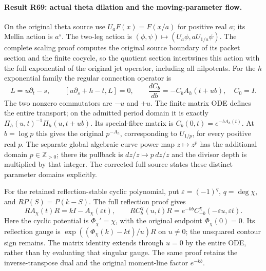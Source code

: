 \paragraph{Result R69: actual theta dilation and the moving-parameter flow.}
On the original theta source use
$U_aF(x)=F(x/a)$ for positive real $a$; its Mellin action is
$a^s$. The two-leg action is
$(\phi,\psi)\mapsto(U_a\phi,aU_{1/a}\psi)$.
The complete scaling proof computes the original source boundary
of its packet section and the finite cocycle, so the quotient
section intertwines this action with the full exponential of
the original jet operator, including all nilpotents.
For the $h$ exponential family the regular connection operator is
\[
L=u\partial_t-s,\qquad
[u\partial_s+h-t,L]=0,
\qquad
\frac{dC_b}{db}=-C_bA_h(t+ub),\quad C_0=I.
\]
The two nonzero commutators are $-u$ and $+u$. The finite matrix
ODE defines the entire transport; on the admitted period domain
it is exactly $\Pi_h(u,t)^{-1}\Pi_h(u,t+ub)$.
Its special-fibre matrix is $C_b(0,t)=e^{-bA_h(t)}$.
At $b=\log p$ this gives the original $p^{-A_h}$, corresponding
to $U_{1/p}$, for every positive real $p$. The separate global algebraic curve power
map $z\mapsto z^p$ has the additional domain $p\in\mathbb Z_{>0}$;
there its pullback is $dz/z\mapsto p\,dz/z$ and the divisor
depth is multiplied by that integer. The corrected full source
states these distinct parameter domains explicitly.

For the retained reflection-stable cyclic polynomial, put
$\varepsilon=(-1)^q$, $q=\deg\chi$, and
$RP(S)=P(k-S)$. The full reflection proof gives
\[
RA_\chi(t)R=kI-A_\chi(\varepsilon t),\qquad
RC_b^\chi(u,t)R=e^{-kb}C_{-b}^\chi(-\varepsilon u,\varepsilon t).
\]
Here the cyclic potential is $\Phi_\chi'=\chi$, with the
original endpoint $\Phi_\chi(0)=0$. Its reflection gauge is
$\exp((\Phi_\chi(k)-kt)/u)R$ on $u\ne0$; the unsquared
contour sign remains. The matrix identity extends through
$u=0$ by the entire ODE, rather than by evaluating that
singular gauge. The same proof retains the inverse-transpose
dual and the original moment-line factor $e^{-kb}$.


